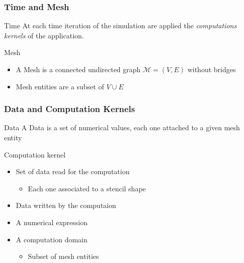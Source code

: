 \documentclass{beamer}
\begin{document}
\begin{frame}
\frametitle{Time and Mesh}
\begin{block}{Time}
At each time iteration of the simulation are applied the \emph{computations kernels} of the application.
\end{block}
\begin{block}{Mesh}
\begin{itemize}
\item A Mesh is a connected undirected graph $\mathcal{M}=(V,E)$ without bridges
\item Mesh entities are a subset of $V \cup E$
\end{itemize}
\end{block}
\begin{center}
\end{center}
\end{frame}

\begin{frame}
\frametitle{Data and Computation Kernels}
\begin{block}{Data}
A Data is a set of numerical values, each one attached to a given mesh entity
\end{block}
\begin{block}{Computation kernel}
\begin{itemize}
\item Set of data read for the computation
\begin{itemize}
\item Each one associated to a stencil shape
\end{itemize}
\item Data written by the computaion
\item A numerical expression
\item A computation domain
\begin{itemize}
\item Subset of mesh entities
\end{itemize}
\end{itemize}
\end{block}
\end{frame}
\end{document}
